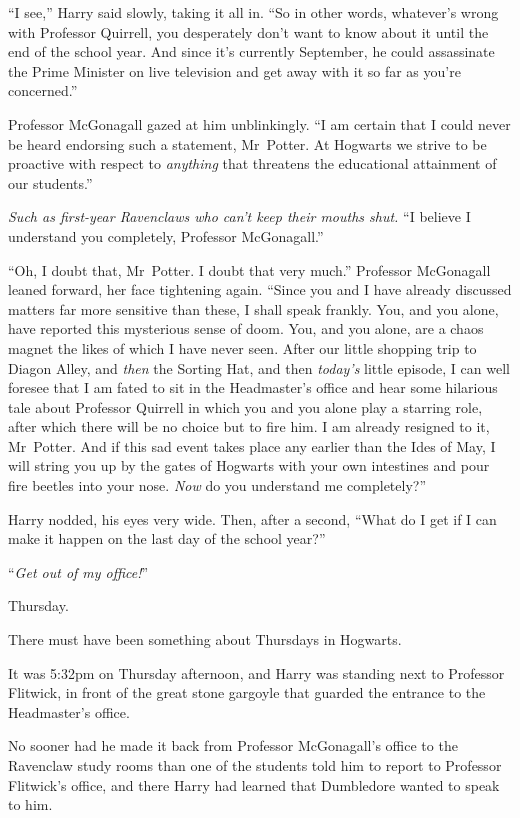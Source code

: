 “I see,” Harry said slowly, taking it all in. “So in other words, whatever’s wrong with Professor Quirrell, you desperately don’t want to know about it until the end of the school year. And since it’s currently September, he could assassinate the Prime Minister on live television and get away with it so far as you’re concerned.”

Professor McGonagall gazed at him unblinkingly. “I am certain that I could never be heard endorsing such a statement, Mr~Potter. At Hogwarts we strive to be proactive with respect to \emph{anything} that threatens the educational attainment of our students.”

\emph{Such as first-year Ravenclaws who can’t keep their mouths shut.} “I believe I understand you completely, Professor McGonagall.”

“Oh, I doubt that, Mr~Potter. I doubt that very much.” Professor McGonagall leaned forward, her face tightening again. “Since you and I have already discussed matters far more sensitive than these, I shall speak frankly. You, and you alone, have reported this mysterious sense of doom. You, and you alone, are a chaos magnet the likes of which I have never seen. After our little shopping trip to Diagon Alley, and \emph{then} the Sorting Hat, and then \emph{today’s} little episode, I can well foresee that I am fated to sit in the Headmaster’s office and hear some hilarious tale about Professor Quirrell in which you and you alone play a starring role, after which there will be no choice but to fire him. I am already resigned to it, Mr~Potter. And if this sad event takes place any earlier than the Ides of May, I will string you up by the gates of Hogwarts with your own intestines and pour fire beetles into your nose. \emph{Now} do you understand me completely?”

Harry nodded, his eyes very wide. Then, after a second, “What do I get if I can make it happen on the last day of the school year?”

“\emph{Get out of my office!}”

\later

Thursday.

There must have been something about Thursdays in Hogwarts.

It was 5:32pm on Thursday afternoon, and Harry was standing next to Professor Flitwick, in front of the great stone gargoyle that guarded the entrance to the Headmaster’s office.

No sooner had he made it back from Professor McGonagall’s office to the Ravenclaw study rooms than one of the students told him to report to Professor Flitwick’s office, and there Harry had learned that Dumbledore wanted to speak to him.

